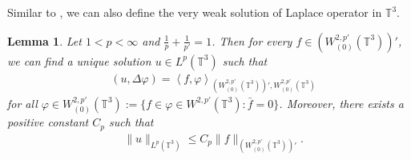 \documentclass[reqno,a4paper,11pt]{amsart}
\theoremstyle{plain}
\newtheorem{lemma}[theorem]{Lemma}
\numberwithin{equation}{section}
\newcommand{\inner}[2]{\left\langle #1 , #2 \right\rangle} %
\begin{document}


Similar to \cite[Lemma 4.2]{AH}, we can also define the very weak solution of Laplace operator in $\mathbb{T}^{3}$.
\begin{lemma}\label{lem3}
	Let $1<p<\infty$ and $\frac{1}{p}+\frac{1}{p'}=1$. Then for every $f\in (W_{(0)}^{2,p'}(\mathbb{T}^{3}))'$, we can find a unique solution $u\in L^{p}(\mathbb{T}^{3})$ such that
	\begin{align*}
		&(u,\Delta\varphi)=\inner{f}{\varphi}_{(W_{(0)}^{2,p'}(\mathbb{T}^{3}))',W_{(0)}^{2,p'}(\mathbb{T}^{3})}
	\end{align*}
	for all $\varphi\in W_{(0)}^{2,p'}(\mathbb{T}^{3}):=\{f\in \varphi\in W^{2,p'}(\mathbb{T}^{3}):\bar{f}=0\}$. Moreover, there exists a positive constant  $C_{p}$ such that
	\begin{align*}
		& \|u\|_{L^{p}(\mathbb{T}^{3})}\leq C_{p}\|f\|_{(W_{(0)}^{2,p'}(\mathbb{T}^{3}))'}.
	\end{align*}
\end{lemma}
\end{document}

